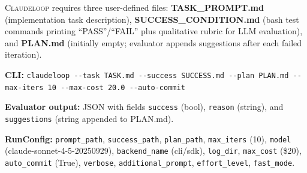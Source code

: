 \documentclass{article}
\begin{document}
\textsc{Claudeloop} requires three user-defined files: \textbf{TASK\_PROMPT.md} (implementation task description), \textbf{SUCCESS\_CONDITION.md} (bash test commands printing ``PASS''/``FAIL'' plus qualitative rubric for LLM evaluation), and \textbf{PLAN.md} (initially empty; evaluator appends suggestions after each failed iteration).

\noindent\textbf{CLI:} \texttt{claudeloop {-}{-}task TASK.md {-}{-}success SUCCESS.md {-}{-}plan PLAN.md {-}{-}max{-}iters 10 {-}{-}max{-}cost 20.0 {-}{-}auto{-}commit}

\noindent\textbf{Evaluator output:} JSON with fields \texttt{success} (bool), \texttt{reason} (string), and \texttt{suggestions} (string appended to PLAN.md).

\noindent\textbf{RunConfig:} \texttt{prompt\_path}, \texttt{success\_path}, \texttt{plan\_path}, \texttt{max\_iters} (10), \texttt{model} (claude-sonnet-4-5-20250929), \texttt{backend\_name} (cli/sdk), \texttt{log\_dir}, \texttt{max\_cost} (\$20), \texttt{auto\_commit} (True), \texttt{verbose}, \texttt{additional\_prompt}, \texttt{effort\_level}, \texttt{fast\_mode}.
\end{document}
